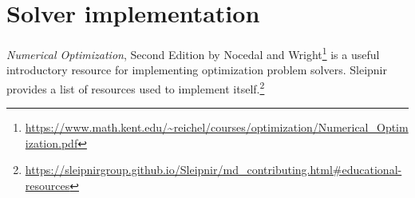 \section{Solver implementation}

\textit{Numerical Optimization}, Second Edition by Nocedal and
Wright\footnote{\url{https://www.math.kent.edu/~reichel/courses/optimization/Numerical_Optimization.pdf}}
is a useful introductory resource for implementing optimization problem solvers.
Sleipnir provides a list of resources used to implement
itself.\footnote{\url{https://sleipnirgroup.github.io/Sleipnir/md_contributing.html\#educational-resources}}
